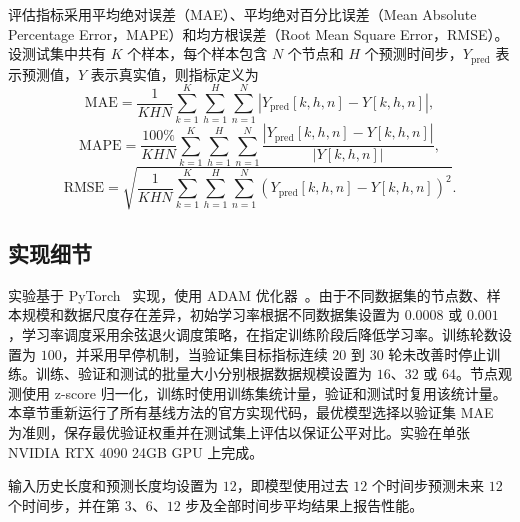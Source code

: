 评估指标采用平均绝对误差（MAE）、平均绝对百分比误差（Mean Absolute Percentage Error，MAPE）和均方根误差（Root Mean Square Error，RMSE）。设测试集中共有 $K$ 个样本，每个样本包含 $N$ 个节点和 $H$ 个预测时间步，$Y_{\mathrm{pred}}$ 表示预测值，$Y$ 表示真实值，则指标定义为
\begin{equation}
\mathrm{MAE}=\frac{1}{KHN}\sum_{k=1}^{K}\sum_{h=1}^{H}\sum_{n=1}^{N}\left|Y_{\mathrm{pred}}[k,h,n]-Y[k,h,n]\right|,
\end{equation}
\begin{equation}
\mathrm{MAPE}=\frac{100\%}{KHN}\sum_{k=1}^{K}\sum_{h=1}^{H}\sum_{n=1}^{N}\frac{\left|Y_{\mathrm{pred}}[k,h,n]-Y[k,h,n]\right|}{\left|Y[k,h,n]\right|},
\end{equation}
\begin{equation}
\mathrm{RMSE}=\sqrt{\frac{1}{KHN}\sum_{k=1}^{K}\sum_{h=1}^{H}\sum_{n=1}^{N}\left(Y_{\mathrm{pred}}[k,h,n]-Y[k,h,n]\right)^{2}}.
\end{equation}

\subsection{实现细节}

实验基于 PyTorch~\cite{pytorch} 实现，使用 ADAM 优化器~\cite{adam}。由于不同数据集的节点数、样本规模和数据尺度存在差异，初始学习率根据不同数据集设置为 $0.0008$ 或 $0.001$，学习率调度采用余弦退火调度策略，在指定训练阶段后降低学习率。训练轮数设置为 $100$，并采用早停机制，当验证集目标指标连续 $20$ 到 $30$ 轮未改善时停止训练。训练、验证和测试的批量大小分别根据数据规模设置为 $16$、$32$ 或 $64$。节点观测使用 z-score 归一化，训练时使用训练集统计量，验证和测试时复用该统计量。本章节重新运行了所有基线方法的官方实现代码，最优模型选择以验证集 MAE 为准则，保存最优验证权重并在测试集上评估以保证公平对比。实验在单张 NVIDIA RTX 4090 24GB GPU 上完成。

输入历史长度和预测长度均设置为 $12$，即模型使用过去 $12$ 个时间步预测未来 $12$ 个时间步，并在第 $3$、$6$、$12$ 步及全部时间步平均结果上报告性能。

